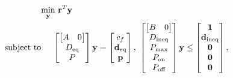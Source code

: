 \begin{equation}
	\begin{aligned}
		& \underset{\mathbf{y}}{\scalebox{1}{\text{min}}} \ \mathbf{r}^T\mathbf{y} \\
		\text{subject to}& \ \ \ \  \begin{bmatrix}
			\begin{bmatrix}A & 0 \end{bmatrix} \\
				D_{\text{eq}} \\
				P
				\end{bmatrix} \mathbf{y} = \begin{bmatrix}c_f \\ \mathbf{d}_{\text{eq}}\\\mathbf{p} \end{bmatrix}, \ \begin{bmatrix}
		\begin{bmatrix} B & 0 \end{bmatrix} \\
			D_{\text{ineq}} \\ 
			P_{\text{max}} \\
			P_{\text{on}} \\
			P_{\text{off}}
			\end{bmatrix}\mathbf{y} \le \begin{bmatrix}\mathbf{1} \\ \mathbf{d}_{\text{ineq}} \\ \mathbf{0} \\ \mathbf{0} \\ \mathbf{0} \end{bmatrix},
	\end{aligned}
\end{equation}


